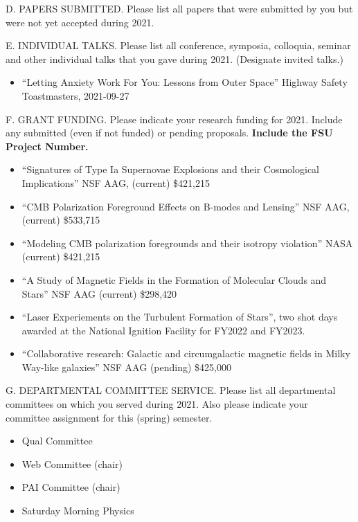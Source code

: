 \noindent D. PAPERS SUBMITTED. Please list all papers that were
submitted by you but were not yet accepted during 2021.
\bigskip


\noindent E. INDIVIDUAL TALKS. Please list all conference, symposia,
colloquia, seminar and other individual talks that you gave during
2021.  (Designate invited talks.)
\bigskip
%
\begin{itemize}
    \item ``Letting Anxiety Work For You: Lessons from Outer Space'' Highway
        Safety Toastmasters, 2021-09-27
\end{itemize}

\noindent F. GRANT FUNDING. Please indicate your research funding
for 2021. Include any submitted  (even if not funded) or pending
proposals.   {\bf Include the FSU Project Number.}
\bigskip
%

\begin{itemize}
    \item ``Signatures of Type Ia Supernovae Explosions and their Cosmological
        Implications'' NSF AAG, (current) \$421,215
    \item ``CMB Polarization Foreground Effects on B-modes and Lensing'' NSF
        AAG, (current) \$533,715
    \item ``Modeling CMB polarization foregrounds and their isotropy violation''
        NASA (current) \$421,215
    \item ``A Study of Magnetic Fields in the Formation of Molecular Clouds and
        Stars'' NSF AAG (current) \$298,420
    \item ``Laser Experiements on the Turbulent Formation of Stars'', two shot
        days awarded at the National Ignition Facility for FY2022 and FY2023.
    \item ``Collaborative research: Galactic and circumgalactic magnetic fields
        in Milky Way-like galaxies'' NSF AAG (pending) \$425,000
\end{itemize}

\noindent G. DEPARTMENTAL COMMITTEE SERVICE. Please list all
departmental committees on which you served during 2021.  Also
please indicate your committee assignment for this (spring)
semester.
\bigskip
%
\begin{itemize}
    \item Qual Committee
    \item Web Committee (chair)
    \item PAI Committee (chair)
    \item Saturday Morning Physics
\end{itemize}

